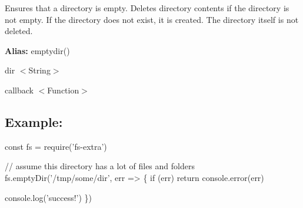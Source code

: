 Ensures that a directory is empty. Deletes directory contents if the directory is not empty. If the directory does not exist, it is created. The directory itself is not deleted.

{\bfseries Alias\+:} {\ttfamily emptydir()}


\begin{DoxyItemize}
\item {\ttfamily dir} {\ttfamily $<$String$>$}
\item {\ttfamily callback} {\ttfamily $<$Function$>$}
\end{DoxyItemize}

\subsection*{Example\+:}


\begin{DoxyCode}
const fs = require('fs-extra')

// assume this directory has a lot of files and folders
fs.emptyDir('/tmp/some/dir', err => \{
  if (err) return console.error(err)

  console.log('success!')
\})
\end{DoxyCode}
 